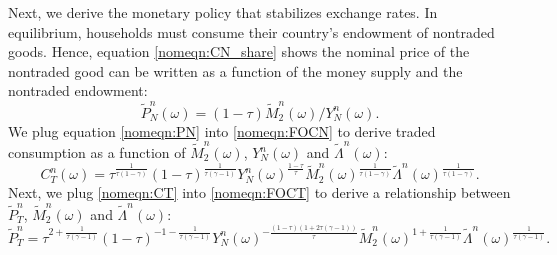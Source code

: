 Next, we derive the monetary policy that stabilizes exchange rates. In
equilibrium, households must consume their country's endowment of
nontraded goods. Hence, equation \eqref{nomeqn:CN_share} shows the
nominal price of the nontraded good can be written as a function of
the money supply and the nontraded endowment:
\begin{equation}
  \tilde{P}^n_N(\omega) = (1 - \tau) \tilde{M}^n_2(\omega) / Y^n_N(\omega).
  \label{nomeqn:PN}
\end{equation}
We plug equation \eqref{nomeqn:PN} into \eqref{nomeqn:FOCN} to derive
traded consumption as a function of $\tilde{M}_2^n(\omega)$,
$Y^n_N(\omega)$ and $\tilde{\Lambda}^n(\omega)$:
\begin{equation}
  C^n_T(\omega) 
  = \tau^{\frac{1}{\tau (1 - \gamma)}} \left( 1 - \tau \right)^{\frac{1}{\tau (\gamma - 1)}}
  Y^n_N(\omega)^{\frac{1 - \tau}{\tau}} 
  \tilde{M}^n_2(\omega)^{\frac{1}{\tau (1 - \gamma)}}
  \tilde{\Lambda}^n(\omega)^{\frac{1}{\tau (1 - \gamma)}}.
  \label{nomeqn:CT}
\end{equation}
Next, we plug \eqref{nomeqn:CT} into \eqref{nomeqn:FOCT} to derive a
relationship between $\tilde{P}^n_T$, $\tilde{M}^n_2(\omega)$ and
$\tilde{\Lambda}^n(\omega)$:
\begin{equation}
  \tilde{P}^n_T =
  \tau^{2 + \frac{1}{\tau (\gamma - 1)}} (1 - \tau)^{-1 - \frac{1}{\tau (\gamma - 1)}}
  Y^n_N(\omega)^{- \frac{(1 - \tau)(1 + 2 \tau (\gamma - 1))}{\tau}}
  \tilde{M}^n_2(\omega)^{1 + \frac{1}{\tau (\gamma - 1)}}
  \tilde{\Lambda}^n(\omega)^{\frac{1}{\tau (\gamma - 1)}}.
  \label{nomeqn:PT}
\end{equation}

